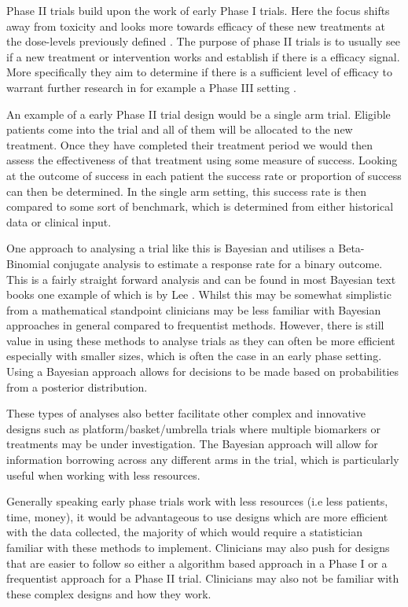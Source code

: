 Phase \RN{2} trials build upon the work of early Phase \RN{1} trials. Here the focus shifts away from toxicity and looks more towards efficacy of these new treatments at the dose-levels previously defined \cite{berryBayesianAdaptiveMethods2010}. The purpose of phase \RN{2} trials is to usually see if a new treatment or intervention works and establish if there is a efficacy signal. More specifically they aim to determine if there is a sufficient level of efficacy to warrant further research in for example a Phase \RN{3} setting \cite{juliousIntroductionStatisticsEarly2010}.

An example of a early Phase \RN{2} trial design would be a single arm trial. Eligible patients come into the trial 
and all of them will be allocated to the new treatment. Once they have completed their treatment period we would then assess
the effectiveness of that treatment using some measure of success. Looking at the outcome of success in each patient the 
success rate or proportion of success can then be determined. In the single arm setting, this success rate is then compared to
some sort of benchmark, which is determined from either historical data or clinical input.

One approach to analysing a trial like this is Bayesian and utilises a Beta-Binomial conjugate analysis to estimate a response rate for a binary outcome. This is a fairly straight forward analysis and can be found in most Bayesian text books one example of which is by Lee \cite{leeBayesianStatisticsIntroduction2012}. Whilst this may be somewhat simplistic from a mathematical standpoint clinicians may be less familiar with Bayesian approaches in general compared to frequentist methods. However, there is still value in using these methods to analyse trials as they can often be more efficient especially with smaller sizes, which is often the case in an early phase setting. Using a Bayesian approach allows for decisions to be made based on probabilities from a posterior distribution.  

These types of analyses also better facilitate other complex and innovative designs such as platform/basket/umbrella trials where multiple biomarkers or treatments may be under investigation. The Bayesian approach will allow for information borrowing across any different arms in the trial, which is particularly useful when working with less resources. 

Generally speaking early phase trials work with less resources (i.e less patients, time, money), it would be advantageous to use designs which are more efficient with the data collected, the majority of which would require a statistician familiar with these methods to implement. Clinicians may also push for designs that are easier to follow so either a algorithm based approach in a Phase \RN{1} or a frequentist approach for a Phase \RN{2} trial. Clinicians may also not be familiar with these complex designs and how they work. 

